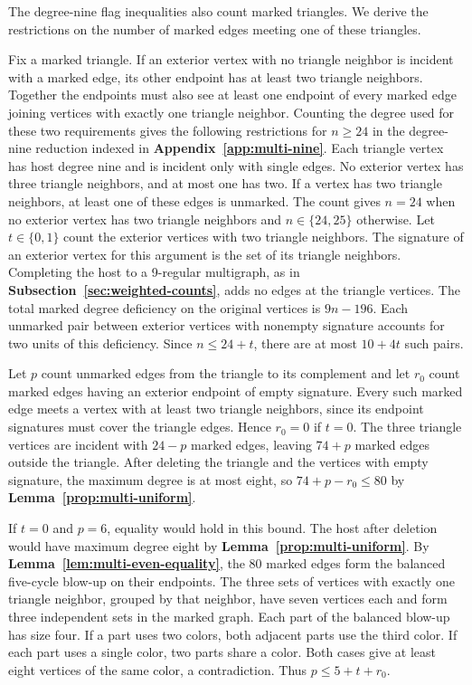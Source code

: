 The degree-nine flag inequalities also count marked triangles. We
derive the restrictions on the number of marked edges meeting one of
these triangles.

Fix a marked triangle. If an exterior vertex with no triangle
neighbor is incident with a marked edge, its other endpoint has at
least two triangle neighbors. Together the endpoints must also see
at least one endpoint of every marked edge joining vertices with
exactly one triangle neighbor. Counting the degree used for these two
requirements gives the following restrictions for $n\geq24$ in
the degree-nine reduction indexed in
\textbf{Appendix~\ref{app:multi-nine}}. Each triangle vertex has host
degree nine and is incident only with single edges. No exterior
vertex has three triangle neighbors, and at most one has two.
If a vertex has two triangle neighbors, at least one of these edges
is unmarked. The count gives $n=24$ when no exterior vertex has two
triangle neighbors and $n\in\{24,25\}$ otherwise.
Let $t\in\{0,1\}$ count the exterior vertices with two
triangle neighbors. The signature of an exterior vertex
for this argument is the set of its triangle neighbors.
Completing the host to a 9-regular multigraph, as in
\textbf{Subsection~\ref{sec:weighted-counts}}, adds no edges
at the triangle vertices. The total marked degree
deficiency on the original vertices is $9n-196$.
Each unmarked pair between exterior vertices with
nonempty signature accounts for two units of this
deficiency. Since $n\le24+t$, there are at most
$10+4t$ such pairs.

Let $p$ count unmarked edges from the triangle to its
complement and let $r_0$ count marked edges having an
exterior endpoint of empty signature. Every such marked
edge meets a vertex with at least two triangle neighbors,
since its endpoint signatures must cover the triangle
edges. Hence $r_0=0$ if $t=0$. The three triangle vertices
are incident with $24-p$ marked edges, leaving $74+p$
marked edges outside the triangle. After deleting the
triangle and the vertices with empty signature, the
maximum degree is at most eight, so
$74+p-r_0\le80$ by \textbf{Lemma~\ref{prop:multi-uniform}}.

If $t=0$ and $p=6$, equality would hold in this bound.
The host after deletion would have maximum degree eight by
\textbf{Lemma~\ref{prop:multi-uniform}}.
By \textbf{Lemma~\ref{lem:multi-even-equality}}, the 80 marked
edges form the balanced five-cycle blow-up on their endpoints.
The three sets of vertices with
exactly one triangle neighbor, grouped by that
neighbor, have seven vertices each and form three
independent sets in the marked graph. Each part of the
balanced blow-up has size four. If a part uses two
colors, both adjacent parts use the third color. If
each part uses a single color, two parts share a color.
Both cases give at least eight vertices of the same
color, a contradiction. Thus $p\le5+t+r_0$.

